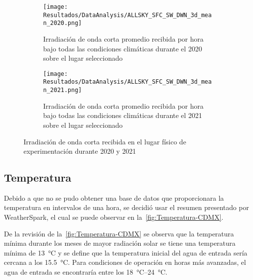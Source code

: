 			\begin{figure}[H]\ContinuedFloat
				\begin{subfigure}[t]{0.45\linewidth}
					\centering
					\texttt{[image: Resultados/DataAnalysis/ALLSKY\_SFC\_SW\_DWN\_3d\_mean\_2020.png]}
					\caption{Irradiación de onda corta promedio recibida por hora bajo todas las condiciones climáticas durante el 2020 sobre el lugar seleccionado}
					\label{fig:ALLSKY_SFC_SW_DWN_3d_mean_2020}
				\end{subfigure}
				\hfill
				\begin{subfigure}[t]{0.45\linewidth}
					\centering
					\texttt{[image: Resultados/DataAnalysis/ALLSKY\_SFC\_SW\_DWN\_3d\_mean\_2021.png]}
					\caption{Irradiación de onda corta promedio recibida por hora bajo todas las condiciones climáticas durante el 2021 sobre el lugar seleccionado}
					\label{fig:ALLSKY_SFC_SW_DWN_3d_mean_2021}
				\end{subfigure}
				\caption{Irradiación de onda corta recibida en el lugar físico de experimentación durante 2020 y 2021}
				\label{fig:SFC_SW_DWN}
			\end{figure}

		\subsection{Temperatura}
			
			Debido a que no se pudo obtener una base de datos que proporcionara la temperatura en intervalos de una hora, se decidió usar el resumen presentado por WeatherSpark, el cual se puede observar en la~\cref{fig:Temperatura-CDMX}.
			
			De la revisión de la~\cref{fig:Temperatura-CDMX} se observa que la temperatura mínima durante los meses de mayor radiación solar se tiene una temperatura mínima de \qty{13}{\degreeCelsius} y se define que la temperatura inicial del agua de entrada sería cercana a los \qty{15.5}{\degreeCelsius}. Para condiciones de operación en horas más avanzadas, el agua de entrada se encontraría entre los \qtyrange{18}{24}{\degreeCelsius}.
			
